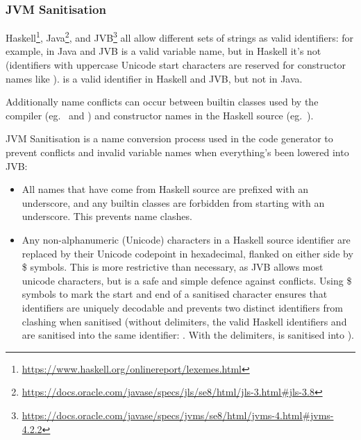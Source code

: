 \documentclass[dissertation.tex]{subfiles}
\begin{document}
{{{{                
            }
        }
        \subsubsection{JVM Sanitisation}
        {

            Haskell\footnote{\url{https://www.haskell.org/onlinereport/lexemes.html}},
            Java\footnote{\url{https://docs.oracle.com/javase/specs/jls/se8/html/jls-3.html\#jls-3.8}}, and
            JVB\footnote{\url{https://docs.oracle.com/javase/specs/jvms/se8/html/jvms-4.html\#jvms-4.2.2}} all allow
            different sets of strings as valid identifiers: for example, in Java and JVB  is a valid variable
            name, but in Haskell it's not (identifiers with uppercase Unicode start characters are reserved for
            constructor names like ). \monospace{+} is a valid identifier in Haskell and JVB, but not in
            Java.

            Additionally name conflicts can occur between builtin classes used by the compiler (eg.\  and
            ) and constructor names in the Haskell source (eg.\ ).

            JVM Sanitisation is a name conversion process used in the code generator to prevent conflicts and invalid
            variable names when everything's been lowered into JVB:

            \begin{itemize}
            \item
            {

                All names that have come from Haskell source are prefixed with an underscore, and any builtin classes
                are forbidden from starting with an underscore. This prevents name clashes.

            }
            \item
            {

                Any non-alphanumeric (Unicode) characters in a Haskell source identifier are replaced by their Unicode
                codepoint in hexadecimal, flanked on either side by \$ symbols. This is more restrictive than necessary,
                as JVB allows most unicode characters, but is a safe and simple defence against conflicts. Using \$
                symbols to mark the start and end of a sanitised character ensures that identifiers are uniquely
                decodable and prevents two distinct identifiers from clashing when sanitised (without delimiters, the
                valid Haskell identifiers \haskell{#\(\pi\)#} and  are sanitised into the same identifier:
                . With the delimiters, \haskell{#\(\pi\)#} is sanitised into ).

}
\end{itemize}}}}
\end{document}
